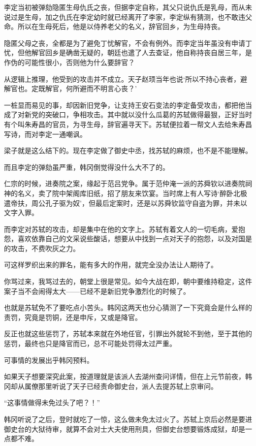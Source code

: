 李定当初被弹劾隐匿生母仇氏之丧，但据李定自称，其父只说仇氏是乳母，而从未说过是生母，加之仇氏在李定幼时就已经离开了李家，李定纵有猜测，也不敢违父命。所以在生母死后，他是以侍养老父的名义，辞官回乡，为生母持丧。

隐匿父母之丧，全都是为了避免丁忧解官，不会有例外。而李定当年虽没有申请丁忧，但他解官回乡是确凿无疑的，朝廷也遣了人去查证，他自称持丧自居三年，是作伪的可能性很小，否则他为什么要辞官？

从逻辑上推理，他受到的攻击并不成立。天子赵顼当年也说‘所以不持心丧者，避解官也。定既解官，何所避而不明言心丧？’

一桩显而易见的事，却因新旧党争，让支持王安石变法的李定备受攻击，都把他当成了对新党的突破口，争相攻击。其中就以没什么瓜葛的苏轼做得最狠，正好当时有个叫朱寿昌的官员，为寻生母，辞官遍寻天下。苏轼便拉着一帮文人去给朱寿昌写诗，而对李定一通嘲讽。

梁子就是这么结下的。现在李定做了御史中丞，找苏轼的麻烦，也不是不能理解。

而且李定的弹劾虽严重，韩冈倒觉得没什么大不了的。

仁宗的时候，进奏院之案，缘起于范吕党争。属于范仲淹一派的苏舜钦以进奏院祠神的名义，卖了院中架阁库旧纸，招了朋友来饮宴。当时席上有人写诗‘醉卧北极遣帝扶，周公孔子驱为奴’，但最后定案时，还是以苏舜钦监守自盗为罪，并未以文字入罪。

而李定对苏轼的攻击，却是集中在他的文字上。苏轼有着文人的一切毛病，爱抱怨，喜欢依靠自己的文采说些酸话，想要从中找到一点对天子的抱怨，以及对国是的攻击，不费吹灰之力。

可这样罗织出来的罪名，能有多大的作用，就完全没办法让人期待了。

你骂过来，我骂过去的，朝堂上很是常见。如今大战在即，朝中要维持稳定，这件案子当不会闹得太大——已经不是新旧党争激烈化的时候了。

也就是苏轼免不了要吃点小苦头。韩冈这两天也分心猜测了一下究竟会是什么样的责罚，究竟是罚铜，还是申斥，又或是降官。

反正也就这些惩罚了，苏轼本来就在外地任官，引罪出外就轮不到他，至于其他的惩罚，最终也只是降官而已，总不可能处罚得太过严重。

可事情的发展出乎韩冈预料。

如果天子想要深究此案，按道理就是该派人去湖州查问详情，但在上元节前夜，韩冈却从属僚那里听说了天子已经责命御史台，派人去提苏轼上京审问。

“这事情做得未免过头了吧？！”

韩冈听说了之后，登时就吃了一惊，这么做未免太过火了。苏轼上京后必然是要进御史台的大狱待审，就算不会对士大夫使用刑具，但御史台想要锻炼成狱，却是一点都不难。


